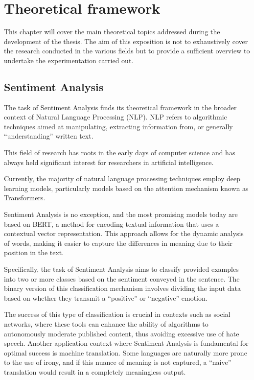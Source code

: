 \chapter{Theoretical framework}

This chapter will cover the main theoretical topics addressed during the development of the thesis. 
The aim of this exposition is not to exhaustively cover the research conducted in the various fields 
but to provide a sufficient overview to undertake the experimentation carried out.

\section{Sentiment Analysis}

The task of Sentiment Analysis\cite{SentAnalysis} finds its theoretical framework in the broader context of Natural Language Processing (NLP). 
NLP refers to algorithmic techniques aimed at manipulating, extracting information from, or generally ``understanding'' written text.

This field of research has roots in the early days of computer science and has always held significant interest for researchers in artificial intelligence.

Currently, the majority of natural language processing techniques employ deep learning models, 
particularly models based on the attention mechanism known as Transformers\cite{Attention}.

Sentiment Analysis is no exception, and the most promising models today are based on BERT\cite{BERT}, 
a method for encoding textual information that uses a contextual vector representation. 
This approach allows for the dynamic analysis of words, making it easier to capture the differences in meaning due to their position in the text.

Specifically, the task of Sentiment Analysis aims to classify provided examples into two or more classes based on the sentiment conveyed in the sentence. 
The binary version of this classification mechanism involves dividing the input data based on whether they transmit a ``positive'' or ``negative'' emotion.

The success of this type of classification is crucial in contexts such as social networks\cite{SentTweeter}, 
where these tools can enhance the ability of algorithms to autonomously moderate published content, 
thus avoiding excessive use of hate speech. 
Another application context where Sentiment Analysis is fundamental for optimal success is machine translation. 
Some languages are naturally more prone to the use of irony, 
and if this nuance of meaning is not captured, a ``naive'' translation would result in a completely meaningless output.


